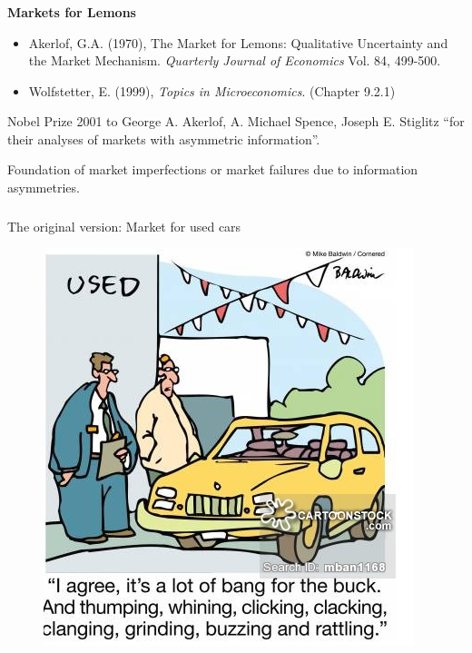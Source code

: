 \documentclass[11pt]{beamer}
\begin{document}
\begin{frame}
\frametitle{\insertsection}

\textbf{Markets for Lemons}

\begin{itemize}
\item Akerlof, G.A. (1970), The Market for Lemons: Qualitative Uncertainty and the Market Mechanism. \textit{Quarterly Journal of Economics} Vol. 84, 499-500.
\item Wolfstetter, E.  (1999), \textit{Topics in Microeconomics}. (Chapter 9.2.1)
\end{itemize}

Nobel Prize 2001 to George A. Akerlof, A. Michael Spence, Joseph E. Stiglitz "`for their analyses of markets with asymmetric information"'.
\par\medskip

Foundation of market imperfections or market failures due to information asymmetries.

\end{frame}


\begin{frame}
\frametitle{\insertsection}

The original version: Market for used cars
\begin{figure}
\includegraphics[width=0.6 \textwidth]{Cars.png}
\end{figure}
\end{frame}
\end{document}
